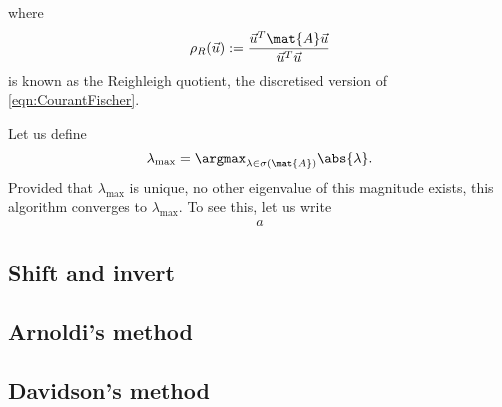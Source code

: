 
where
\[ \rho_R(\vec{u}) := \frac{\vec{u}^T \mat{A} \vec{u}}{\vec{u}^T \vec{u}} \]
is known as the Reighleigh quotient,
the discretised version of \eqref{eqn:CourantFischer}.

Let us define
\[ \lambda_\text{max} = \argmax_{\lambda \in \sigma(\mat{A})} \abs{\lambda}. \]
Provided that $\lambda_\text{max}$ is unique,
\ie no other eigenvalue of this magnitude exists,
this algorithm converges to $\lambda_\text{max}$.
To see this, let us write
\begin{align}
	a
\end{align}




\subsection{Shift and invert}

\subsection{Arnoldi's method}

\subsection{Davidson's method}

